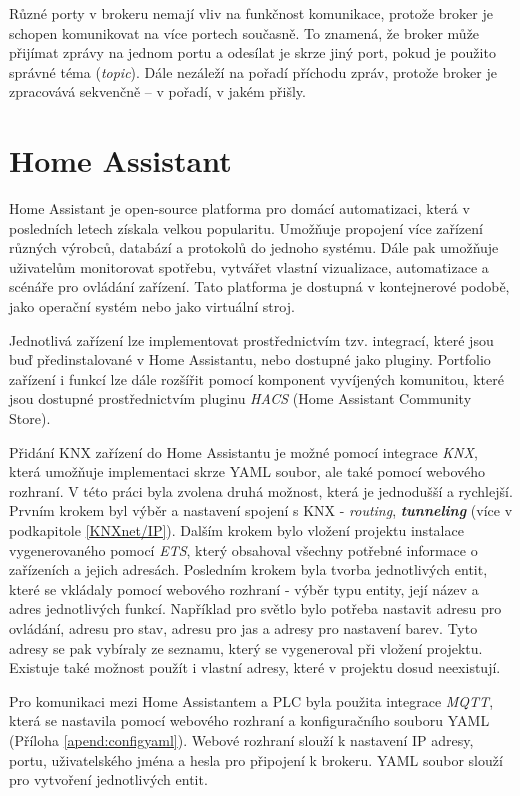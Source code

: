 Různé porty v brokeru nemají vliv na funkčnost komunikace, protože broker je schopen komunikovat na více portech současně. To znamená, že broker může přijímat zprávy na jednom portu a odesílat je skrze jiný port, pokud je použito správné téma (\textit{topic}). Dále nezáleží na pořadí příchodu zpráv, protože broker je zpracovává sekvenčně – v pořadí, v jakém přišly.
\section{Home Assistant}
Home Assistant je open-source platforma pro domácí automatizaci, která v posledních letech získala velkou popularitu. Umožňuje propojení více zařízení různých výrobců, databází a protokolů do jednoho systému. Dále pak umožňuje uživatelům monitorovat spotřebu, vytvářet vlastní vizualizace, automatizace a scénáře pro ovládání zařízení. Tato platforma je dostupná v kontejnerové podobě, jako operační systém nebo jako virtuální stroj. \cite{Home Assistant}

Jednotlivá zařízení lze implementovat prostřednictvím tzv. integrací, které jsou buď předinstalované v Home Assistantu, nebo dostupné jako pluginy. Portfolio zařízení i funkcí lze dále rozšířit pomocí komponent vyvíjených komunitou, které jsou dostupné prostřednictvím pluginu \textit{HACS} (Home Assistant Community Store). \cite{HACS}

Přidání KNX zařízení do Home Assistantu je možné pomocí integrace \textit{KNX}, která umožňuje implementaci skrze YAML soubor, ale také pomocí webového rozhraní. V této práci byla zvolena druhá možnost, která je jednodušší a rychlejší. Prvním krokem byl výběr a nastavení spojení s KNX - \textit{routing}, \textbf{\textit{tunneling}} (více v podkapitole \ref{KNXnet/IP}). Dalším krokem bylo vložení projektu instalace vygenerovaného pomocí \textit{ETS}, který obsahoval všechny potřebné informace o zařízeních a jejich adresách. Posledním krokem byla tvorba jednotlivých entit, které se vkládaly pomocí webového rozhraní - výběr typu entity, její název a adres jednotlivých funkcí. Například pro světlo bylo potřeba nastavit adresu pro ovládání, adresu pro stav, adresu pro jas a adresy pro nastavení barev. Tyto adresy se pak vybíraly ze seznamu, který se vygeneroval při vložení projektu. Existuje také možnost použít i vlastní adresy, které v projektu dosud neexistují.

Pro komunikaci mezi Home Assistantem a PLC byla použita integrace \textit{MQTT}, která se nastavila pomocí webového rozhraní a konfiguračního souboru YAML (Příloha \ref{apend:configyaml}). Webové rozhraní slouží k nastavení IP adresy, portu, uživatelského jména a hesla pro připojení k brokeru. YAML soubor slouží pro vytvoření jednotlivých entit.

